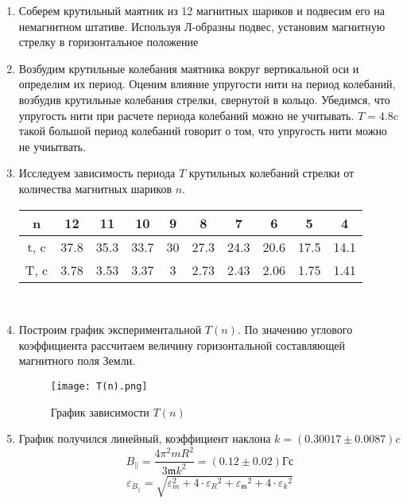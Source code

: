 \documentclass[12pt,a4paper]{article}
\begin{document}
\begin{enumerate}
    \item Соберем крутильный маятник из 12 магнитных шариков и подвесим его на немагнитном штативе. Используя Л-образны подвес, установим магнитную стрелку в горизонтальное положение 
    \item Возбудим крутильные колебания маятника вокруг вертикальной оси и определим их период. Оценим влияние упругости нити на период колебаний, возбудив крутильные колебания стрелки, свернутой в кольцо.
    Убедимся, что упругость нити при расчете периода колебаний можно не учитывать. $T = 4.8 \text{c}$ такой большой период колебаний говорит о том, что упругость нити можно не учиытвать.
    \item Исследуем зависимость периода $T$ крутильных колебаний стрелки от количества магнитных шариков $n$.
    \\
    \begin{tabular}{|c|c|c|c|c|c|c|c|c|c|} \hline
        n & 12 & 11 & 10 & 9 & 8 & 7 & 6 & 5 & 4\\\hline
        t, c & 37.8 & 35.3 & 33.7 & 30 & 27.3 & 24.3 & 20.6 & 17.5 & 14.1\\ \hline
        T, c & 3.78 & 3.53 & 3.37 & 3 & 2.73 & 2.43 & 2.06 & 1.75 & 1.41\\ \hline
    \end{tabular}
    \\
    \item Построим график экспериментальной $T(n)$. По значению углового коэффициента рассчитаем величину горизонтальной составляющей магнитного поля Земли. 
    \\
    \begin{figure}[h!]
        \begin{center}
            \texttt{[image: T(n).png]}
            \caption{График зависимости $T(n)$}
            \label{fig:facility}
        \end{center}
    \end{figure} 
    \item График получился линейный, коэффициент наклона $k = (0.30017 \pm 0.0087) c$
    \begin{equation}
        B_{\parallel} = \frac{4\pi^2 mR^2}{3\mathfrak{m}k^2} = (0.12 \pm 0.02) \text{Гс}
    \end{equation}
    \begin{equation}
        \varepsilon_{B_{\parallel}} = \sqrt{{\varepsilon_{m}^2} + 4\cdot {\varepsilon_{R}}^2 + {\varepsilon_{\mathfrak{m}}}^2 + 4\cdot {\varepsilon_{k}}^2 }
    \end{equation}
\end{enumerate}
\end{document}
